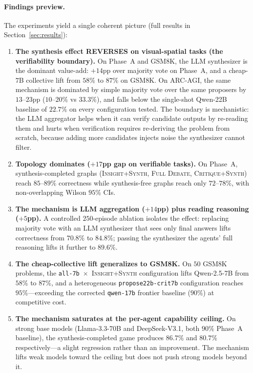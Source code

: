 \documentclass[11pt]{amsart}
\newcommand\1{{\mathds{1}}}
\theoremstyle{definition}
\theoremstyle{remark}
\numberwithin{equation}{section}
\begin{document}
\paragraph{Findings preview.}
The experiments yield a single coherent picture (full results in Section~\ref{sec:results}):
\begin{enumerate}[leftmargin=1.2em, itemsep=2pt]
\item \textbf{The synthesis effect REVERSES on visual-spatial tasks (the verifiability boundary).}
On Phase~A and GSM8K, the LLM synthesizer is the dominant value-add: $+14$pp over majority vote on Phase~A, and a cheap-$7$B collective lift from $58\%$ to $87\%$ on GSM8K.
On ARC-AGI, the same mechanism is dominated by simple majority vote over the same proposers by $13$--$23$pp ($10$--$20\%$ vs $33.3\%$), and falls below the single-shot Qwen-22B baseline of $22.7\%$ on every configuration tested.
The boundary is mechanistic: the LLM aggregator helps when it can verify candidate outputs by re-reading them and hurts when verification requires re-deriving the problem from scratch, because adding more candidates injects noise the synthesizer cannot filter.
\item \textbf{Topology dominates ($+17$pp gap on verifiable tasks).}
On Phase~A, synthesis-completed graphs (\textsc{Insight+Synth}, \textsc{Full Debate}, \textsc{Critique+Synth}) reach $85$--$89\%$ correctness while synthesis-free graphs reach only $72$--$78\%$, with non-overlapping Wilson $95\%$ CIs.
\item \textbf{The mechanism is LLM aggregation ($+14$pp) plus reading reasoning ($+5$pp).}
A controlled $250$-episode ablation isolates the effect: replacing majority vote with an LLM synthesizer that sees only final answers lifts correctness from $70.8\%$ to $84.8\%$; passing the synthesizer the agents' full reasoning lifts it further to $89.6\%$.
\item \textbf{The cheap-collective lift generalizes to GSM8K.}
On $50$ GSM8K problems, the \texttt{all-7b}~$\times$~\textsc{Insight+Synth} configuration lifts Qwen-2.5-7B from $58\%$ to $87\%$, and a heterogeneous \texttt{propose22b-crit7b} configuration reaches $95\%$---exceeding the corrected \texttt{qwen-17b} frontier baseline ($90\%$) at competitive cost.
\item \textbf{The mechanism saturates at the per-agent capability ceiling.}
On strong base models (Llama-3.3-70B and DeepSeek-V3.1, both $90\%$ Phase~A baseline), the synthesis-completed game produces $86.7\%$ and $80.7\%$ respectively---a slight regression rather than an improvement. The mechanism lifts weak models toward the ceiling but does not push strong models beyond it.

\end{enumerate}
\end{document}
